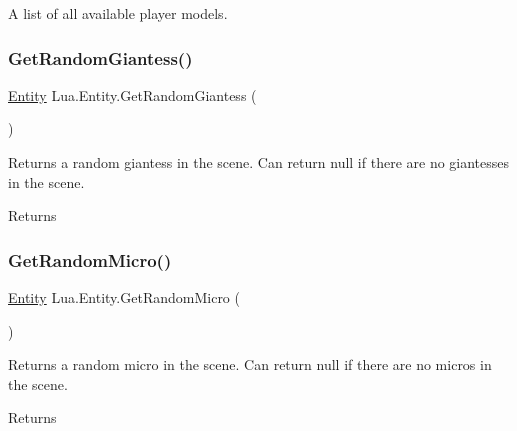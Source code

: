 A list of all available player models. 

\mbox{\label{class_lua_1_1_entity_aa9df9f39762cb24b89449e8b61aab43c}} 
\subsubsection{\texorpdfstring{GetRandomGiantess()}{GetRandomGiantess()}}
{\footnotesize\ttfamily \mbox{\hyperlink{class_lua_1_1_entity}{Entity}} Lua.\+Entity.\+Get\+Random\+Giantess (\begin{DoxyParamCaption}{ }\end{DoxyParamCaption})}



Returns a random giantess in the scene. Can return null if there are no giantesses in the scene. 

\begin{DoxyReturn}{Returns}

\end{DoxyReturn}
\mbox{\label{class_lua_1_1_entity_aad0651348795eb39acee39055e0b7638}} 
\subsubsection{\texorpdfstring{GetRandomMicro()}{GetRandomMicro()}}
{\footnotesize\ttfamily \mbox{\hyperlink{class_lua_1_1_entity}{Entity}} Lua.\+Entity.\+Get\+Random\+Micro (\begin{DoxyParamCaption}{ }\end{DoxyParamCaption})}



Returns a random micro in the scene. Can return null if there are no micros in the scene. 

\begin{DoxyReturn}{Returns}

\end{DoxyReturn}
\mbox{\label{class_lua_1_1_entity_af3f7aae31ecb691380a6f18f053fb907}} 
